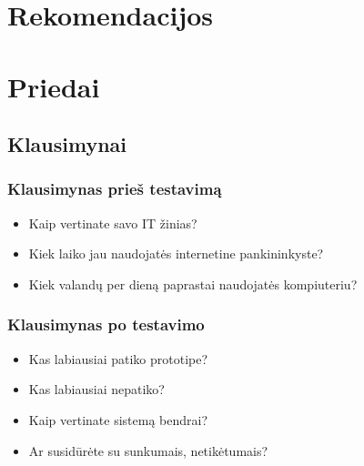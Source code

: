 \documentclass[oneside]{VUMIFPSkursinis}
\begin{document}
\section{Rekomendacijos}

\section{Priedai}
\subsection{Klausimynai}
\subsubsection{Klausimynas prieš testavimą}
\begin{itemize}
	\item Kaip vertinate savo IT žinias?
	\item Kiek laiko jau naudojatės internetine pankininkyste?
	\item Kiek valandų per dieną paprastai naudojatės kompiuteriu?
\end{itemize}
\subsubsection{Klausimynas po testavimo}
	\begin{itemize}
			\item Kas labiausiai patiko prototipe?
			\item Kas labiausiai nepatiko?
			\item Kaip vertinate sistemą bendrai?
			\item Ar susidūrėte su sunkumais, netikėtumais?
	\end{itemize}
\end{document}
